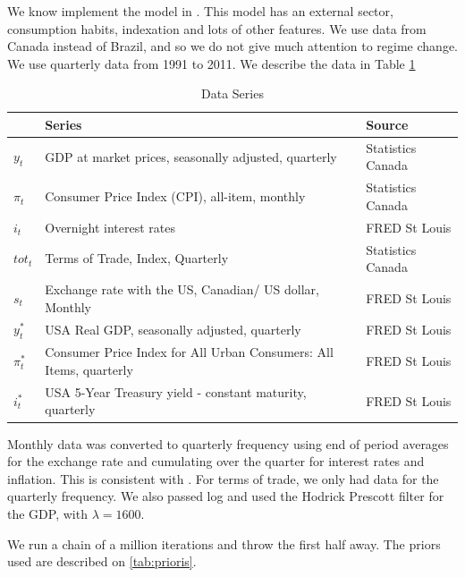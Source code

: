 \documentclass[12pt,a4paper]{article}
\begin{document}
We know implement the model in \cite{carvalho2015}. This model has an external sector, consumption habits, indexation and lots of other features. We use data from Canada instead of Brazil, and so we do not give much attention to regime change. We use quarterly data from 1991 to 2011. We describe the data in Table \ref{tab:data}

\begin{table}[!h]
	\centering
	\caption{Data Series}
	\label{tab:data}
	\begin{tabular}{lll}
		\hline
		& Series & Source\\
		\hline
		$y_t$ & GDP at market prices, seasonally adjusted, quarterly  & Statistics Canada\\
		$\pi_t$ & Consumer Price Index (CPI), all-item, monthly & Statistics Canada\\
		$i_t$ & Overnight interest rates & FRED St Louis \\
		$tot_t$ & Terms of Trade, Index, Quarterly & Statistics Canada \\
		$s_t$ & Exchange rate with the US, Canadian/ US dollar, Monthly & FRED St Louis \\
		$y^{*}_t$ & USA Real GDP, seasonally adjusted, quarterly & FRED St Louis\\
		$\pi^{*}_t$ & 
		Consumer Price Index for All Urban Consumers: All Items, quarterly & FRED St Louis\\
		$i^{*}_t$ & USA 5-Year Treasury yield - constant maturity, quarterly & FRED St Louis\\
		\hline
	\end{tabular}
\end{table}

Monthly data was converted to quarterly frequency using end of period averages for the exchange rate and cumulating over the quarter for interest rates and inflation. This is consistent with \cite{carvalho2015}. For terms of trade, we only had data for the quarterly frequency. We also passed log and used the Hodrick Prescott filter for the GDP, with $\lambda = 1600$.

We run a chain of a million iterations and throw the first half away. The priors used are described on \ref{tab:prioris}.
\end{document}
